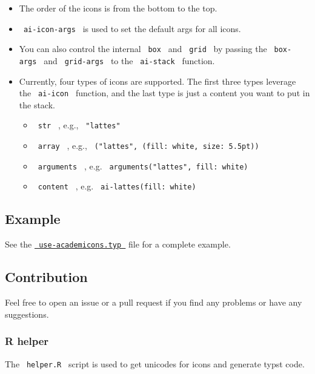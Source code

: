 \begin{itemize}
\tightlist
\item
  The order of the icons is from the bottom to the top.
\item
  \texttt{\ ai-icon-args\ } is used to set the default args for all
  icons.
\item
  You can also control the internal \texttt{\ box\ } and
  \texttt{\ grid\ } by passing the \texttt{\ box-args\ } and
  \texttt{\ grid-args\ } to the \texttt{\ ai-stack\ } function.
\item
  Currently, four types of icons are supported. The first three types
  leverage the \texttt{\ ai-icon\ } function, and the last type is just
  a content you want to put in the stack.

  \begin{itemize}
  \tightlist
  \item
    \texttt{\ str\ } , e.g., \texttt{\ "lattes"\ }
  \item
    \texttt{\ array\ } , e.g.,
    \texttt{\ ("lattes",\ (fill:\ white,\ size:\ 5.5pt))\ }
  \item
    \texttt{\ arguments\ } , e.g.
    \texttt{\ arguments("lattes",\ fill:\ white)\ }
  \item
    \texttt{\ content\ } , e.g. \texttt{\ ai-lattes(fill:\ white)\ }
  \end{itemize}
\end{itemize}

\subsection{Example}\label{example}

See the
\href{https://typst.app/project/rsgOFC4YkwpN7OqtRyiXP3}{\texttt{\ use-academicons.typ\ }}
file for a complete example.

\subsection{Contribution}\label{contribution}

Feel free to open an issue or a pull request if you find any problems or
have any suggestions.

\subsubsection{R helper}\label{r-helper}

The \texttt{\ helper.R\ } script is used to get unicodes for icons and
generate typst code.

